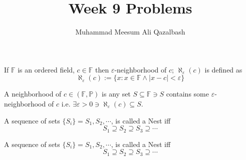 \documentclass[addpoints]{exam}
\title{Week 9 Problems}
\author{Muhammad Meesum Ali Qazalbash}
\theoremstyle{mytheoremstyle}
\theoremstyle{mytheoremstyle}
\theoremstyle{myproblemstyle}
\begin{document}
\maketitle

\begin{definition}
	If \(\mathbb{F}\) is an ordered field, \(c\in\mathbb{F}\) then \(\varepsilon\)-neighborhood of \(c\); \(\aleph_{\varepsilon}(c)\) is defined as
	\[\aleph_{\varepsilon}(c):=\{x:x\in\mathbb{F}\land |x-c|<\varepsilon\}\]
\end{definition}

\begin{definition}[Neighborhood]
	A neighborhood of \(c\in(\mathbb{F},\mathbb{P})\) is any set \(S\subseteq\mathbb{F}\ni S\) contains some \(\varepsilon\)-neighborhood of \(c\) i.e. \(\exists \varepsilon>0\ni\aleph_{\varepsilon}(c)\subseteq S\).
\end{definition}

\begin{definition}[Nest]
	A sequence of sets \(\{S_i\}=S_1,S_2,\cdots\), is called a Nest iff \[S_1\supseteq S_2\supseteq S_3\supseteq\cdots\]
\end{definition}

\begin{definition}
	A sequence of sets \(\{S_i\}=S_1,S_2,\cdots\), is called a Nest iff \[S_1\supseteq S_2\supseteq S_3\supseteq\cdots\]
\end{definition}

\end{document}
